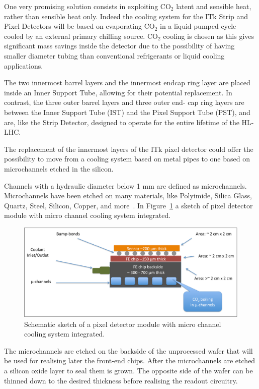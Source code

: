 One very promising solution consists in exploiting CO$_2$ latent and sensible heat, rather than sensible 
heat only. 
Indeed the cooling system for the ITk Strip and Pixel Detectors will be based on evaporating CO$_2$ in a 
liquid 
pumped cycle cooled by an external primary chilling source.  CO$_2$ cooling is chosen as this gives 
significant mass savings inside the detector due to the possibility of having smaller diameter tubing than 
conventional refrigerants or liquid cooling applications.


The two innermost barrel layers and the innermost endcap ring layer are placed inside an Inner Support 
Tube, allowing for their potential replacement. In contrast, the three outer barrel layers and three outer end-
cap ring layers are between the Inner Support Tube (IST) and the Pixel Support Tube (PST), and are, like 
the Strip Detector, designed to operate for the entire lifetime of the HL-LHC.

The replacement of the innermost layers of the ITk pixel detector could offer the possibility to move from 
a cooling system based on metal pipes to one based on microchannels etched in the silicon.

Channels with a hydraulic diameter below 1 mm are defined as microchannels. Microchannels have been etched on many materials, like Polyimide, Silica Glass, Quartz, Steel, Silicon, Copper, 
and more~\cite{KOSAR2010635}.
In Figure~\ref{fig:uChannels} a sketch of pixel detector module with micro channel cooling system integrated.
\begin{figure}[!htpb]
\centering
\includegraphics[width=1.0\textwidth]{uChannels.pdf}
\caption{\label{fig:uChannels}Schematic sketch of a pixel detector module with micro channel cooling system integrated.}
\end{figure}

The microchannels are etched on the backside of the unprocessed wafer that will be used for realising 
later the front-end chips. After the microchannels are etched a silicon oxide layer to seal them is grown. 
The opposite side of the wafer can be thinned down to the desired thickness before realising the 
readout circuitry. 

